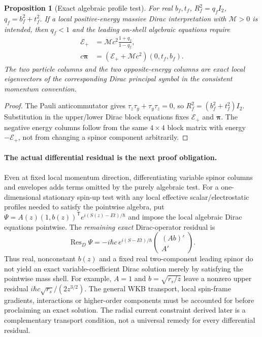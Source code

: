 \documentclass[11pt,a4paper]{article}
\newtheorem{proposition}{Proposition}[section]
\begin{document}
\begin{proposition}[Exact algebraic profile test]\label{prop:qgd065-profile-test}
For real $b_f,t_f$, $R_f^2=q_fI_2$, $q_f=b_f^2+t_f^2$.  If a local
positive-energy massive Dirac interpretation with $\mathcal M>0$ is intended, then
$q_f<1$ and the leading on-shell algebraic equations require
\begin{equation}\label{eq:qgd065-on-shell}
\boxed{\begin{aligned}
\mathcal E_+&=\mathcal M c^2\frac{1+q_f}{1-q_f},\\
 c\bm\pi&=(\mathcal E_++\mathcal M c^2)(0,t_f,b_f).
\end{aligned}}
\end{equation}
The two particle columns and the two opposite-energy columns are exact
local eigenvectors of the corresponding Dirac principal symbol in the
consistent momentum convention.
\end{proposition}
\begin{proof}
The Pauli anticommutator gives $\tau_z\tau_y+\tau_y\tau_z=0$,
so $R_f^2=(b_f^2+t_f^2)I_2$.  Substitution in the upper/lower
Dirac block equations fixes $\mathcal E_+$ and $\bm\pi$.  The negative
energy columns follow from the same $4\times4$ block matrix with energy
$-\mathcal E_+$, not from changing a spinor component arbitrarily.
\end{proof}

\paragraph{The actual differential residual is the next proof obligation.}
Even at fixed local momentum direction, differentiating variable spinor
columns and envelopes adds terms omitted by the purely algebraic test.
For a one-dimensional stationary spin-up test with any local effective
scalar/electrostatic profiles needed to satisfy the pointwise algebra, put
$\Psi=A(z)(1,b(z))^{\mathsf T}e^{i(S(z)-Et)/\hbar}$ and impose the
local algebraic Dirac equations pointwise.  The \emph{remaining exact}
Dirac-operator residual is
\begin{equation}\label{eq:qgd065-transport-residual}
\boxed{\displaystyle
\operatorname{Res}_D\Psi=-i\hbar c\,e^{i(S-Et)/\hbar}
\begin{pmatrix}(Ab)'\\ A'\end{pmatrix}.}
\end{equation}
Thus real, nonconstant $b(z)$ and a fixed real two-component leading
spinor do not yield an exact variable-coefficient Dirac solution merely by satisfying the
pointwise mass shell.  For example, $A=1$ and $b=\sqrt{r_s/z}$ leave a
nonzero upper residual $i\hbar c\sqrt{r_s}/(2z^{3/2})$.  The general
WKB transport, local spin-frame gradients, interactions or higher-order
components must be accounted for before proclaiming an exact solution.
The radial current constraint derived later is a complementary transport
condition, not a universal remedy for every differential residual.
\end{document}
